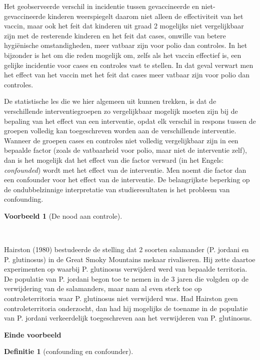 \documentclass[
  dutch,
  letterpaper,
  12pt]{book}
\theoremstyle{definition}
\theoremstyle{definition}
\newtheorem{definition}{Definitie}[chapter]
\theoremstyle{definition}
\newtheorem{example}{Voorbeeld}[chapter]
\theoremstyle{remark}
\begin{document}
Het geobserveerde verschil in incidentie tussen gevaccineerde en
niet-gevaccineerde kinderen weerspiegelt daarom niet alleen de
effectiviteit van het vaccin, maar ook het feit dat kinderen uit graad 2
mogelijks niet vergelijkbaar zijn met de resterende kinderen en het feit
dat cases, omwille van betere hygiënische omstandigheden, meer vatbaar
zijn voor polio dan controles. In het bijzonder is het om die reden
mogelijk om, zelfs als het vaccin effectief is, een gelijke incidentie
voor cases en controles vast te stellen. In dat geval verwart men het
effect van het vaccin met het feit dat cases meer vatbaar zijn voor
polio dan controles.

De statistische les die we hier algemeen uit kunnen trekken, is dat de
verschillende interventiegroepen zo vergelijkbaar mogelijk moeten zijn
bij de bepaling van het effect van een interventie, opdat elk verschil
in respons tussen de groepen volledig kan toegeschreven worden aan de
verschillende interventie. Wanneer de groepen cases en controles niet
volledig vergelijkbaar zijn in een bepaalde factor (zoals de vatbaarheid
voor polio, maar niet de interventie zelf), dan is het mogelijk dat het
effect van die factor verward (in het Engels: \emph{confounded}) wordt
met het effect van de interventie. Men noemt die factor dan een
confounder voor het effect van de interventie. De belangrijkste
beperking op de ondubbelzinnige interpretatie van studieresultaten is
het probleem van confounding.

\begin{example}[De nood aan
controle]\protect\hypertarget{exm-de-nood-aan-controle}{}\label{exm-de-nood-aan-controle}

~

\end{example}

Hairston (1980) bestudeerde de stelling dat 2 soorten salamander (P.
jordani en P. glutinosus) in de Great Smoky Mountains mekaar
rivaliseren. Hij zette daartoe experimenten op waarbij P. glutinosus
verwijderd werd van bepaalde territoria. De populatie van P. jordani
begon toe te nemen in de 3 jaren die volgden op de verwijdering van de
salamanders, maar nam al even sterk toe op controleterritoria waar P.
glutinosus niet verwijderd was. Had Hairston geen controleterritoria
onderzocht, dan had hij mogelijks de toename in de populatie van P.
jordani verkeerdelijk toegeschreven aan het verwijderen van P.
glutinosus.

\textbf{Einde voorbeeld}

\begin{definition}[confounding en
confounder]\protect\hypertarget{def-confounding-en-confounder}{}\label{def-confounding-en-confounder}

~

\end{definition}
\end{document}

